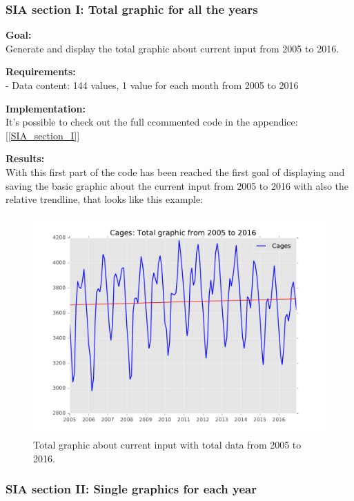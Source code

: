 \newpage

\subsubsection{SIA section I: Total graphic for all the years}
\textbf{Goal:}\\
Generate and display the total graphic about current input from 2005 to 2016.

\textbf{Requirements:}\\
- Data content: 144 values, 1 value for each month from 2005 to 2016

\textbf{Implementation:}\\
It's possible to check out the full ccommented code in the appendice: [\ref{SIA_section_I}]

\textbf{Results:} \\
With this first part of the code has been reached the first goal of displaying and saving the basic graphic about the current input from 2005 to 2016 with also the relative trendline, that looks like this example:

\begin{figure}[H]
\includegraphics[width=1\textwidth]{Files/Cages_Total.pdf}
\caption{Total graphic about current input with total data from 2005 to 2016.}
\end{figure}



\newpage
\subsubsection{SIA section II: Single graphics for each year}

